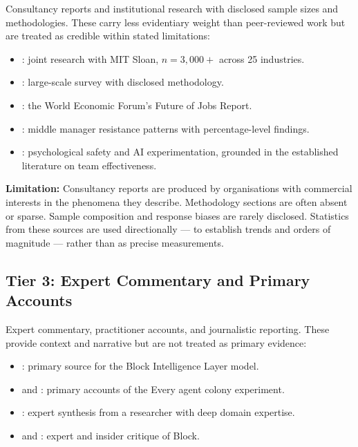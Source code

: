 Consultancy reports and institutional research with disclosed sample sizes and methodologies. These carry less evidentiary weight than peer-reviewed work but are treated as credible within stated limitations:

\begin{itemize}
  \item \textcite{BCGAIKPIs2025}: joint research with MIT Sloan, $n = 3{,}000+$ across 25 industries.
  \item \textcite{MicrosoftWorkTrend2024}: large-scale survey with disclosed methodology.
  \item \textcite{WEF2025}: the World Economic Forum's Future of Jobs Report.
  \item \textcite{Capgemini2025}: middle manager resistance patterns with percentage-level findings.
  \item \textcite{EdmondsonLei2025}: psychological safety and AI experimentation, grounded in the established literature on team effectiveness.
\end{itemize}

\textbf{Limitation:} Consultancy reports are produced by organisations with commercial interests in the phenomena they describe. Methodology sections are often absent or sparse. Sample composition and response biases are rarely disclosed. Statistics from these sources are used directionally --- to establish trends and orders of magnitude --- rather than as precise measurements.

\subsection{Tier 3: Expert Commentary and Primary Accounts}

Expert commentary, practitioner accounts, and journalistic reporting. These provide context and narrative but are not treated as primary evidence:

\begin{itemize}
  \item \textcite{DorseyBotha2026}: primary source for the Block Intelligence Layer model.
  \item \textcite{Shipper2026} and \textcite{Klaassen2025}: primary accounts of the Every agent colony experiment.
  \item \textcite{Mollick2025Management}: expert synthesis from a researcher with deep domain expertise.
  \item \textcite{Spicer2026} and \textcite{Zamost2026}: expert and insider critique of Block.
\end{itemize}

